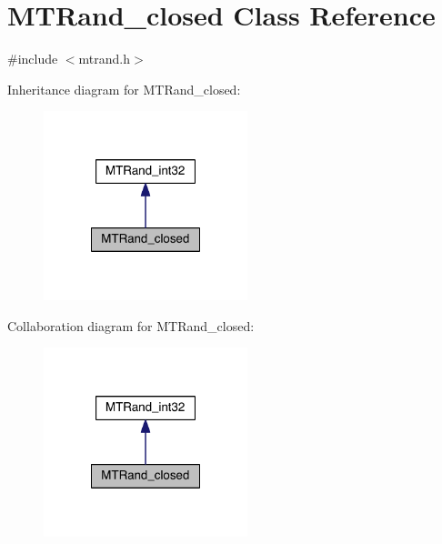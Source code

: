 \hypertarget{a00018}{\section{M\-T\-Rand\-\_\-closed Class Reference}
\label{a00018}
}


{\ttfamily \#include $<$mtrand.\-h$>$}



Inheritance diagram for M\-T\-Rand\-\_\-closed\-:\nopagebreak
\begin{figure}[H]
\begin{center}
\leavevmode
\includegraphics[width=168pt]{a00157}
\end{center}
\end{figure}


Collaboration diagram for M\-T\-Rand\-\_\-closed\-:\nopagebreak
\begin{figure}[H]
\begin{center}
\leavevmode
\includegraphics[width=168pt]{a00158}
\end{center}
\end{figure}
